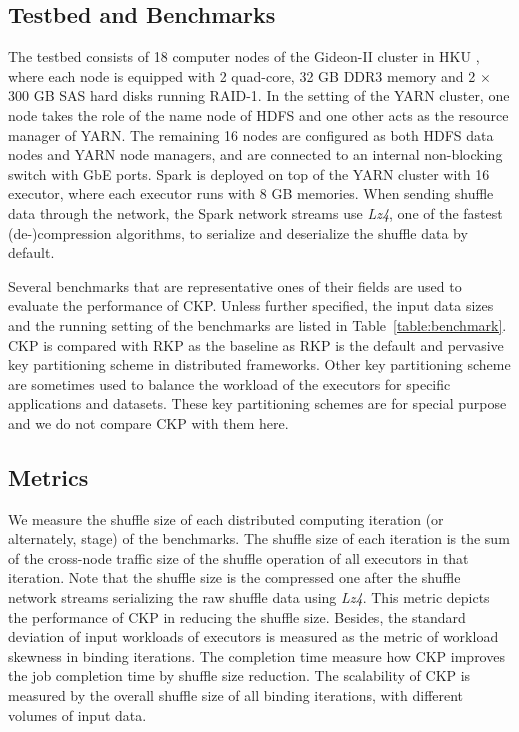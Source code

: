 \documentclass[10pt,journal,compsoc]{IEEEtran}
\begin{document}
\subsection{Testbed and Benchmarks}
The testbed consists of 18 computer nodes of the Gideon-II cluster in
HKU \cite{gideon}, where each node is equipped with 2 quad-core, 32 GB
DDR3 memory and 2 $\times$ 300 GB SAS hard disks running RAID-1.
In the setting of the YARN cluster, one node takes the role of  the name
node of HDFS and one other acts as the resource manager of YARN. The
remaining 16 nodes are configured as both HDFS data nodes and YARN node
managers, and are connected to an internal non-blocking switch with GbE
ports.
Spark is deployed on top of the YARN cluster with 16 executor, where each executor runs with 8 GB memories. 
When sending shuffle data through the network, the Spark network streams use
\emph{Lz4}, one of the fastest (de-)compression algorithms, to serialize
and deserialize the shuffle data by default.



Several benchmarks that are representative ones of their fields are used to evaluate the performance of CKP.
Unless further specified, the input data sizes and the running setting of the benchmarks are listed in Table~\ref{table:benchmark}.
CKP is compared with RKP as the baseline as RKP is the default and pervasive key partitioning scheme in distributed frameworks. 
Other key partitioning scheme are sometimes used to balance the workload of the executors for specific applications and datasets. 
These key partitioning schemes are for special purpose and we do not compare CKP with them here. 

\subsection{Metrics}
We measure the shuffle size of each distributed computing iteration (or alternately, stage) of the benchmarks. 
The shuffle size of each iteration is the sum of the cross-node traffic size of the shuffle operation of all executors in that iteration. 
Note that the shuffle size is the compressed one after the shuffle
network streams serializing the raw shuffle data using \emph{Lz4}. 
This metric depicts the performance of CKP in reducing the shuffle size. 
Besides, the standard deviation of input workloads of executors is measured as the metric of workload skewness in binding iterations. 
The completion time measure how CKP improves the job completion time by shuffle 
size reduction.
The scalability of CKP is measured by the overall shuffle size of all binding iterations, with different volumes of input data. 
\end{document}

